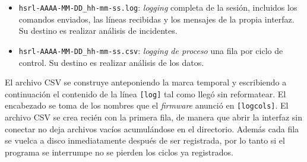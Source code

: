 \begin{itemize}
\item \texttt{hsrl-AAAA-MM-DD\_hh-mm-ss.log}: \textit{logging} completa de la sesión, incluidos los comandos enviados, las líneas recibidas y los mensajes de la propia interfaz. Su destino es realizar análisis de incidentes.
\item \texttt{hsrl-AAAA-MM-DD\_hh-mm-ss.csv}: \textit{logging de proceso} una fila por ciclo de control. Su destino es realizar análisis de los datos.
\end{itemize}

El archivo CSV se construye anteponiendo la marca temporal y escribiendo a continuación el contenido de la línea \texttt{[log]} tal como llegó sin reformatear. El encabezado se toma de los nombres que el \emph{firmware} anunció en \texttt{[logcols]}. El archivo CSV se crea recién con la primera fila, de manera que abrir la interfaz sin conectar no deja archivos vacíos acumulándose en el directorio. Además cada fila se vuelca a disco inmediatamente después de ser registrada, por lo tanto si el programa se interrumpe no se pierden los ciclos ya registrados.